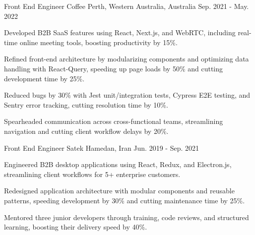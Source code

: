 \begin{cventries}
  \cventry
  {Front End Engineer} %
  {Coffee} %
  {Perth, Western Australia, Australia} %
  {Sep. 2021 - May. 2022} %
  {
    \begin{cvitems} %
      \item {Developed B2B SaaS features using React, Next.js, and WebRTC, including real-time online meeting tools, boosting productivity by 15\%.}
      \item {Refined front-end architecture by modularizing components and optimizing data handling with React-Query, speeding up page loads by 50\% and cutting development time by 25\%.}
      \item {Reduced bugs by 30\% with Jest unit/integration tests, Cypress E2E testing, and Sentry error tracking, cutting resolution time by 10\%.}
      \item {Spearheaded communication across cross-functional teams, streamlining navigation and cutting client workflow delays by 20\%.}
    \end{cvitems}
  }

  \cventry
  {Front End Engineer} %
  {Satek} %
  {Hamedan, Iran} %
  {Jun. 2019 - Sep. 2021} %
  {
    \begin{cvitems} %
      \item {Engineered B2B desktop applications using React, Redux, and Electron.js, streamlining client workflows for 5+ enterprise customers.}
      \item {Redesigned application architecture with modular components and reusable patterns, speeding development by 30\% and cutting maintenance time by 25\%.}
      \item {Mentored three junior developers through training, code reviews, and structured learning, boosting their delivery speed by 40\%.}
    \end{cvitems}
  }


\end{cventries}
